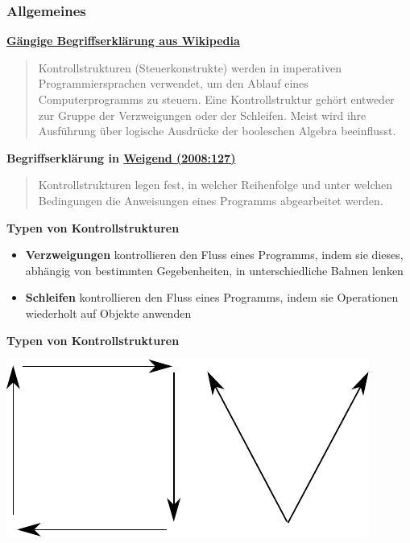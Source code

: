 \subsubsection{Allgemeines}
\par\noindent\textbf{\href{http://de.wikipedia.org/wiki/Kontrollstruktur}{Gängige
Begriffserklärung aus Wikipedia}}

\begin{quote}
Kontrollstrukturen (Steuerkonstrukte) werden in imperativen
Programmiersprachen verwendet, um den Ablauf eines Computerprogramms zu
steuern. Eine Kontrollstruktur gehört entweder zur Gruppe der
Verzweigungen oder der Schleifen. Meist wird ihre Ausführung über
logische Ausdrücke der booleschen Algebra beeinflusst.
\end{quote}



\par\noindent\textbf{Begriffserklärung in
\href{http://bibliography.lingpy.org?key=Weigend2008}{Weigend
(2008:127)}}

\begin{quote}
Kontrollstrukturen legen fest, in welcher Reihenfolge und unter welchen
Bedingungen die Anweisungen eines Programms abgearbeitet werden.
\end{quote}



\par\noindent\textbf{Typen von Kontrollstrukturen}

\begin{itemize}
\itemsep1pt\parskip0pt
\item
  {\textbf{Verzweigungen} kontrollieren den Fluss eines Programms, indem
  sie dieses, abhängig von bestimmten Gegebenheiten, in unterschiedliche
  Bahnen lenken}
\item
  {\textbf{Schleifen} kontrollieren den Fluss eines Programms, indem sie
  Operationen wiederholt auf Objekte anwenden}
\end{itemize}



\par\noindent\textbf{Typen von Kontrollstrukturen}

\includegraphics[width=\textwidth]{img/kontrollstrukturen.pdf}


